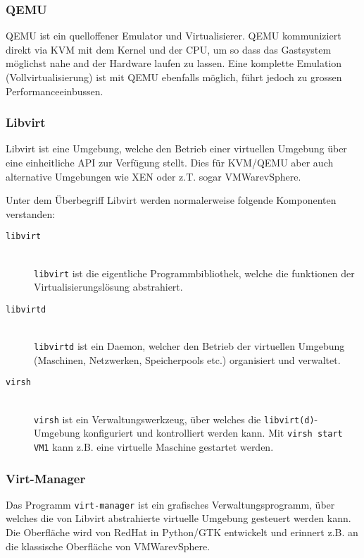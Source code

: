 \subsubsection{QEMU}
QEMU ist ein quelloffener Emulator und Virtualisierer. QEMU kommuniziert direkt via KVM mit dem Kernel und der CPU, um so dass das Gastsystem möglichst nahe and der Hardware laufen zu lassen. Eine komplette Emulation (Vollvirtualisierung) ist mit QEMU ebenfalls möglich, führt jedoch zu grossen Performanceeinbussen.

\subsubsection{Libvirt}

Libvirt ist eine Umgebung, welche den Betrieb einer virtuellen Umgebung über eine einheitliche API zur Verfügung stellt. Dies für KVM/QEMU aber auch alternative Umgebungen wie XEN oder z.T. sogar VMWare\textregistered  vSphere\texttrademark.

Unter dem Überbegriff Libvirt werden normalerweise folgende Komponenten verstanden:

\begin{description}
	\item[\lstinline|libvirt|] \hfill \\
		\lstinline|libvirt| ist die eigentliche Programmbibliothek, welche die funktionen der Virtualisierungslösung abstrahiert.
	\item[\lstinline|libvirtd|] \hfill \\
		\lstinline|libvirtd| ist ein Daemon, welcher den Betrieb der virtuellen Umgebung (Maschinen, Netzwerken, Speicherpools etc.) organisiert und verwaltet.
	\item[\lstinline|virsh|] \hfill \\
		\lstinline|virsh| ist ein Verwaltungswerkzeug, über welches die \lstinline|libvirt(d)|-Umgebung konfiguriert und kontrolliert werden kann. Mit \lstinline|virsh start VM1| kann z.B. eine virtuelle Maschine gestartet werden.
\end{description}

\subsubsection{Virt-Manager}

Das Programm \lstinline|virt-manager| ist ein grafisches Verwaltungsprogramm, über welches die von Libvirt abstrahierte virtuelle Umgebung gesteuert werden kann. Die Oberfläche wird von RedHat in Python/GTK entwickelt und erinnert z.B. an die klassische Oberfläche von VMWare\textregistered vSphere\texttrademark.

